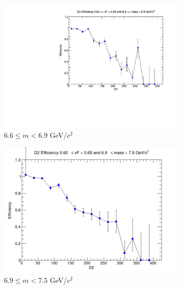 \begin{figure}[p]
\begin{subfigure}[b]{0.32\textwidth}
        \includegraphics[width=\textwidth]{./kTrackerEfficiencyPlots/D2_Efficiency_xF12_mass8.pdf}
        \caption{$6.6 \leq m < 6.9$ GeV/$c^2$}
        \label{fig:xF12_mass8}
    \end{subfigure}
    \vspace{0.5cm}
    \begin{subfigure}[b]{0.32\textwidth}
        \centering
        \includegraphics[width=\textwidth]{./kTrackerEfficiencyPlots/D2_Efficiency_xF12_mass9.png}
        \caption{$6.9 \leq m < 7.5$ GeV/$c^2$}
        \label{fig:xF12_mass9}
    \end{subfigure}
    \hfill
    \begin{subfigure}[b]{0.32\textwidth}
        \centering

\end{subfigure}
\end{figure}
